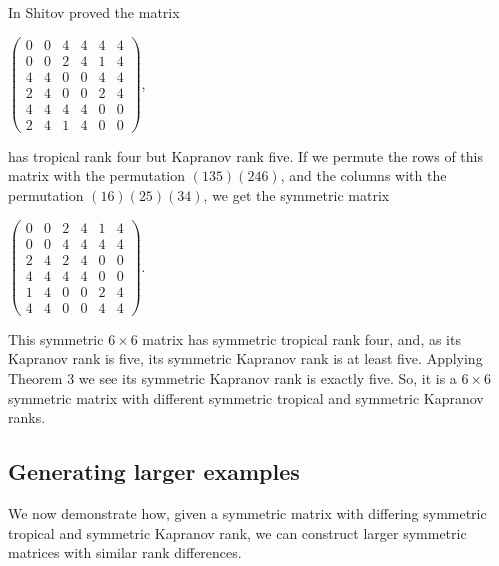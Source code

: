\documentclass{article}
\begin{document}
In \cite{sh1} Shitov proved the matrix
\begin{center}
  $\left(\begin{array}{cccccc} 0 & 0 & 4 & 4 & 4 & 4 \\ 0 & 0 & 2 & 4 & 1 & 4 \\ 4 & 4 & 0 & 0 & 4 & 4 \\ 2 & 4 & 0 & 0 & 2 & 4 \\ 4 & 4 & 4 & 4 & 0 & 0 \\ 2 & 4 & 1 & 4 & 0 & 0 \end{array}\right)$,
\end{center}
has tropical rank four but Kapranov rank five. If we permute the rows of this matrix with the permutation $(135)(246)$, and the columns with the permutation $(16)(25)(34)$, we get the symmetric matrix
\begin{center}
  $\left(\begin{array}{cccccc} 0 & 0 & 2 & 4 & 1 & 4 \\ 0 & 0 & 4 & 4 & 4 & 4 \\ 2 & 4 & 2 & 4 & 0 & 0 \\ 4 & 4 & 4 & 4 & 0 & 0 \\ 1 & 4 & 0 & 0 & 2 & 4 \\ 4 & 4 & 0 & 0 & 4 & 4 \end{array}\right)$.
\end{center}
This symmetric $6 \times 6$ matrix has symmetric tropical rank four, and, as its Kapranov rank is five, its symmetric Kapranov rank is at least five. Applying Theorem 3 we see its symmetric Kapranov rank is exactly five. So, it is a $6 \times 6$ symmetric matrix with different symmetric tropical and symmetric Kapranov ranks.

\subsection{Generating larger examples}

We now demonstrate how, given a symmetric matrix with differing symmetric tropical and symmetric Kapranov rank, we can construct larger symmetric matrices with similar rank differences.
\end{document}
